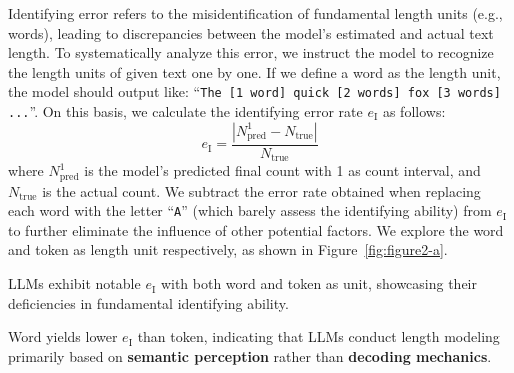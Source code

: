 Identifying error refers to the misidentification of fundamental length units (e.g., words), leading to discrepancies between the model’s estimated and actual text length.
To systematically analyze this error, we instruct the model to recognize the length units of given text one by one. If we define a word as the length unit, the model should output like: ``\texttt{The [1 word] quick [2 words] fox [3 words] ...}''.
On this basis, we calculate the identifying error rate $e_{\text{I}}$ as follows:
\begin{equation}
e_{\text{I}} = \frac{|N_{\mathrm{pred}}^{\mathrm{1}} - N_{\mathrm{true}}|}{N_{\mathrm{true}}} 
\label{eq:e1}
\end{equation}
where \( N_{\mathrm{pred}}^{\mathrm{1}} \) is the model’s predicted final count with 1 as count interval, and \( N_{\mathrm{true}} \) is the actual count.
% 
We subtract the error rate obtained when replacing each word with the letter ``\texttt{A}'' (which barely assess the identifying ability) from $e_{\text{I}}$ to further eliminate the influence of other potential factors.
We explore the word and token as length unit respectively,
as shown in Figure~\ref{fig:figure2-a}.

\begin{finding}
\label{find1}
LLMs exhibit notable $e_{\text{I}}$ with both word and token as unit, showcasing their deficiencies in fundamental identifying ability.
\end{finding}
\begin{finding}
\label{find2}
Word yields lower $e_{\text{I}}$ than token, indicating that LLMs conduct length modeling primarily based on \textbf{semantic perception} rather than \textbf{decoding mechanics}.
\end{finding}

